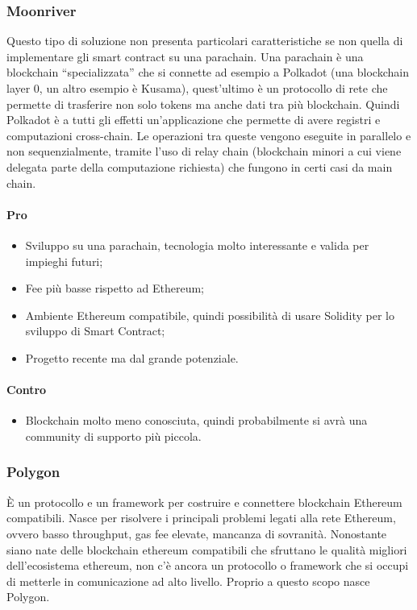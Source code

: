 		\subsubsection{Moonriver}
		Questo tipo di soluzione non presenta particolari caratteristiche se non quella di implementare gli smart contract su una parachain. Una parachain è una blockchain “specializzata” che si connette ad esempio a Polkadot (una blockchain layer 0, un altro esempio è Kusama), quest'ultimo è un protocollo di rete che permette di trasferire non solo tokens ma anche dati tra più blockchain. Quindi Polkadot è a tutti gli effetti un'applicazione che permette di avere registri e computazioni cross-chain.
		Le operazioni tra queste vengono eseguite in parallelo e non sequenzialmente, tramite l'uso di relay chain (blockchain minori a cui viene delegata parte della computazione richiesta) che fungono in certi casi da main chain.
		\paragraph{Pro}
		\begin{itemize}
			\item Sviluppo su una parachain, tecnologia molto interessante e valida per impieghi futuri;
			\item Fee più basse rispetto ad Ethereum\glo{};
			\item Ambiente Ethereum\glo{} compatibile, quindi possibilità di usare Solidity\glo{} per lo sviluppo di Smart Contract;
			\item Progetto recente ma dal grande potenziale.
		\end{itemize}
		\paragraph{Contro}
		\begin{itemize}
			\item Blockchain molto meno conosciuta, quindi probabilmente si avrà una community di supporto più piccola.
		\end{itemize}
		
		\subsubsection{Polygon}
		È un protocollo e un framework per costruire e connettere blockchain Ethereum\glo{} compatibili. Nasce per risolvere i principali problemi legati alla rete Ethereum\glo{}, ovvero basso throughput, gas fee elevate, mancanza di sovranità.
		Nonostante siano nate delle blockchain ethereum compatibili che sfruttano le qualità migliori dell'ecosistema ethereum\glo{}, non c'è ancora un protocollo o framework che si occupi di metterle in comunicazione ad alto livello. Proprio a questo scopo nasce Polygon.
	
